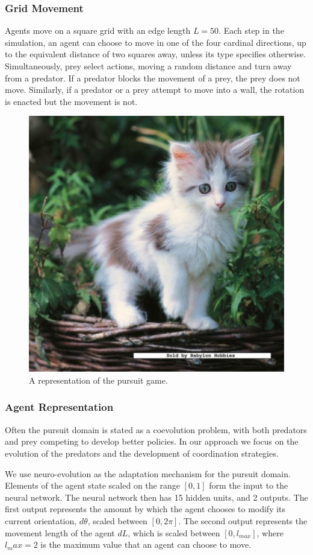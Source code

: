 \documentclass{aamas2014}
\begin{document}
\subsubsection{Grid Movement}

Agents move on a square grid with an edge length $L=50$. Each step in the simulation, an agent can choose to move in one of the four cardinal directions, up to the equivalent distance of two squares away, unless its type specifies otherwise. Simultaneously, prey select actions, moving a random distance and turn away from a predator. If a predator blocks the movement of a prey, the prey does not move. Similarly, if a predator or a prey attempt to move into a wall, the rotation is enacted but the movement is not.


\begin{figure}[h!]
\includegraphics[width=.5\textwidth]{pics/kitten}
\caption{A representation of the pursuit game.}
\label{fig:game}
\end{figure}

\subsubsection{Agent Representation}

Often the pursuit domain is stated as a coevolution problem, with both predators and prey competing to develop better policies. In our approach we focus on the evolution of the predators and the development of coordination strategies.

We use neuro-evolution as the adaptation mechanism for the pursuit domain. Elements of the agent state scaled on the range $[0,1]$ form the input to the neural network. The neural network then has 15 hidden units, and 2 outputs. The first output represents the amount by which the agent chooses to modify its current orientation, $d\theta$, scaled between $[0,2\pi]$. The second output represents the movement length of the agent $dL$, which is scaled between $[0,l_{max}]$, where $l_max=2$ is the maximum value that an agent can choose to move.
\end{document}
